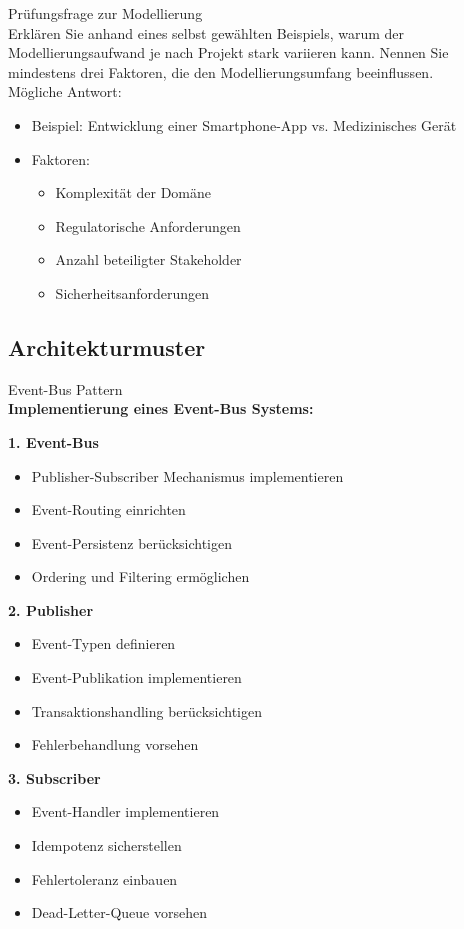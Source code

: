 \begin{example2}{Prüfungsfrage zur Modellierung}\\
Erklären Sie anhand eines selbst gewählten Beispiels, warum der Modellierungsaufwand je nach Projekt stark variieren kann. Nennen Sie mindestens drei Faktoren, die den Modellierungsumfang beeinflussen.
\vspace{3mm}\\
Mögliche Antwort:
\begin{itemize}
    \item Beispiel: Entwicklung einer Smartphone-App vs. Medizinisches Gerät
    \item Faktoren:
    \begin{itemize}
        \item Komplexität der Domäne
        \item Regulatorische Anforderungen
        \item Anzahl beteiligter Stakeholder
        \item Sicherheitsanforderungen
    \end{itemize}
\end{itemize}
\end{example2}

\subsection{Architekturmuster}

\begin{KR}{Event-Bus Pattern}\\
\textbf{Implementierung eines Event-Bus Systems:}

\textbf{1. Event-Bus}

\begin{itemize}
    \item Publisher-Subscriber Mechanismus implementieren
    \item Event-Routing einrichten
    \item Event-Persistenz berücksichtigen
    \item Ordering und Filtering ermöglichen
\end{itemize}

\textbf{2. Publisher}

\begin{itemize}
    \item Event-Typen definieren
    \item Event-Publikation implementieren
    \item Transaktionshandling berücksichtigen
    \item Fehlerbehandlung vorsehen
\end{itemize}

\textbf{3. Subscriber}

\begin{itemize}
    \item Event-Handler implementieren
    \item Idempotenz sicherstellen
    \item Fehlertoleranz einbauen
    \item Dead-Letter-Queue vorsehen
\end{itemize}
\end{KR}

